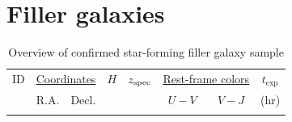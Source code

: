\documentclass[twocolumn, astrosymb]{aastex631}
\begin{document}
\section{Filler galaxies}\label{ap:SF_gals}
\begin{table}[b]
\centering
\caption{Overview of confirmed star-forming filler galaxy sample}
\label{tab:filler_sample}
\begin{tabular}{l l c c c c c r}
\hline \hline
\multicolumn{1}{c}{ID} & \multicolumn{2}{c}{\underline{Coordinates}} & \multicolumn{1}{c}{$H$}  & \multicolumn{1}{c}{$z_{\rm spec}$} &  \multicolumn{2}{c}{\underline{Rest-frame colors}} & \multicolumn{1}{c}{$t_{\text{exp}}$} \\
& \multicolumn{1}{c}{R.A.} & 
\multicolumn{1}{c}{Decl.} & & & $U-V$ & $V-J$ & \multicolumn{1}{c}{(hr)} \\
\hline 
\\ 
\hline\hline
\end{tabular}
\end{table}
\end{document}
